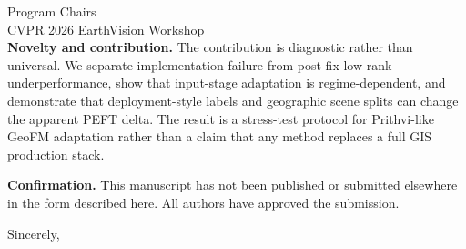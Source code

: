 \documentclass[11pt]{letter}
\begin{document}
\begin{letter}{%
  Program Chairs \\
  CVPR 2026 EarthVision Workshop \\
}
\textbf{Novelty and contribution.}
The contribution is diagnostic rather than universal. We separate implementation failure from post-fix low-rank underperformance, show that input-stage adaptation is regime-dependent, and demonstrate that deployment-style labels and geographic scene splits can change the apparent PEFT delta. The result is a stress-test protocol for Prithvi-like GeoFM adaptation rather than a claim that any method replaces a full GIS production stack.

\textbf{Confirmation.}
This manuscript has not been published or submitted elsewhere in the form described here. All authors have approved the submission.

\closing{Sincerely,}

\end{letter}
\end{document}

